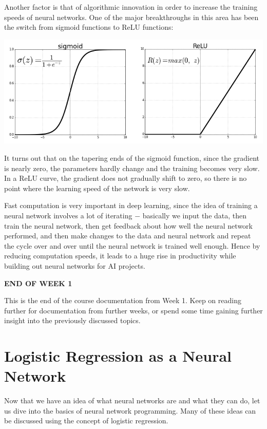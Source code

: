 \documentclass{article}[a4paper,12pt]
\theoremstyle{definition}
\begin{document}
Another factor is that of algorithmic innovation in order to increase the training speeds of neural networks. One of the major breakthroughs in this area has been the switch from sigmoid functions to ReLU functions:
\begin{center}\includegraphics[scale=0.5]{sigmoid_relu.png}\end{center}
It turns out that on the tapering ends of the sigmoid function, since the gradient is nearly zero, the parameters hardly change and the training becomes very slow. In a ReLU curve, the gradient does not gradually shift to zero, so there is no point where the learning speed of the network is very slow. 
\vspace{6pt}

Fast computation is very important in deep learning, since the idea of training a neural network involves a lot of iterating $-$ basically we input the data, then train the neural network, then get feedback about how well the neural network performed, and then make changes to the data and neural network and repeat the cycle over and over until the neural network is trained well enough. Hence by reducing computation speeds, it leads to a huge rise in productivity while building out neural networks for AI projects.

\hrulefill
\begin{center}\textbf{END OF WEEK 1}\end{center}
This is the end of the course documentation from Week 1. Keep on reading further for documentation from further weeks, or spend some time gaining further insight into the previously discussed topics.

\hrulefill
\pagebreak
\section{Logistic Regression as a Neural Network}
Now that we have an idea of what neural networks are and what they can do, let us dive into the basics of neural network programming. Many of these ideas can be discussed using the concept of logistic regression.
\vspace{6pt}
\end{document}
